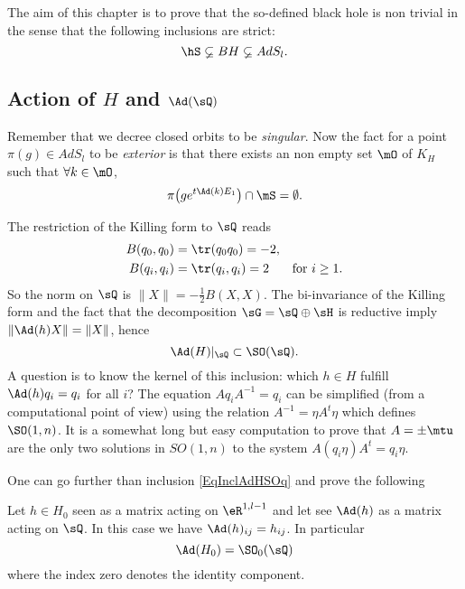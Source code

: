 The aim of this chapter is to prove that the so-defined black hole is non trivial in the sense that the following inclusions are strict:
\begin{equation}		\label{EqhSssubBH}
    \hS\varsubsetneq BH\varsubsetneq AdS_l.
\end{equation}

\subsection{Action of \texorpdfstring{$H$}{H} and \texorpdfstring{$\Ad(\sQ)$}{AdQ}}

Remember that we decree closed orbits to be \emph{singular}. Now the fact for a point $\pi(g)\in AdS_l$ to be \emph{exterior} is that there exists an non empty set $\mO$ of $K_H$ such that $\forall k\in\mO$,
\[
  \pi\big( g e^{t\Ad(k)E_1}  \big)\cap\mS=\emptyset.
\]

The restriction of the Killing form to $\sQ$ reads
\begin{subequations}
\begin{align}
	B(q_0,q_0)&=\tr(q_0q_0)=-2,\\
	B(q_{i},q_{i})&=\tr(q_{i},q_{i})=2&\textrm{for $i\geq 1$}.
\end{align}
\end{subequations}
So the norm on $\sQ$ is $\| X \|=-\frac{ 1 }{2}B(X,X)$. The bi-invariance of the Killing form and the fact that the decomposition $\sG=\sQ\oplus\sH$ is reductive  imply $\| \Ad(h)X \|=\| X \|$, hence
\begin{equation}  \label{EqInclAdHSOq}
  \Ad(H)|_{\sQ}\subset\SO(\sQ).
\end{equation}
A question is to know the kernel of this inclusion: which $h\in H$ fulfill $\Ad(h)q_i=q_i$ for all $i$? The equation $Aq_iA^{-1}=q_i$ can be simplified (from a computational point of view) using the relation $A^{-1}=\eta A^t\eta$ which defines $\SO(1,n)$. It is a somewhat long but easy computation to prove that $A=\pm\mtu$ are the only two solutions in $SO(1,n)$ to the system $A(q_i\eta)A^t=q_i\eta$.

One can go further than inclusion \eqref{EqInclAdHSOq} and prove the following
\begin{proposition}
 Let $h\in H_0$ seen as a matrix acting on $\eR^{1,l-1}$ and let see $\Ad(h)$ as a matrix acting on $\sQ$. In this case we have $\Ad(h)_{ij}=h_{ij}$. In particular
\begin{equation}
   \Ad(H_0)=\SO_0(\sQ)
\end{equation}
where the index zero denotes the identity component.
\label{PropSOADHequal}
\end{proposition}

